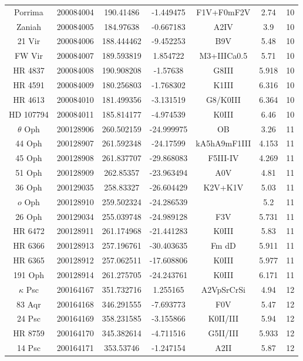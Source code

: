 \begin{table*}
\begin{tabular}{ccccccc}
Porrima & 200084004 & 190.41486 & -1.449475 & F1V+F0mF2V & 2.74 & 10 \\
Zaniah & 200084005 & 184.97638 & -0.667183 & A2IV & 3.9 & 10 \\
21 Vir & 200084006 & 188.444462 & -9.452253 & B9V & 5.48 & 10 \\
FW Vir & 200084007 & 189.593819 & 1.854722 & M3+IIICa0.5 & 5.71 & 10 \\
HR 4837 & 200084008 & 190.908208 & -1.57638 & G8III & 5.918 & 10 \\
HR 4591 & 200084009 & 180.256803 & -1.768302 & K1III & 6.316 & 10 \\
HR 4613 & 200084010 & 181.499356 & -3.131519 & G8/K0III & 6.364 & 10 \\
HD 107794 & 200084011 & 185.814177 & -4.974539 & K0III & 6.46 & 10 \\
$\theta$ Oph & 200128906 & 260.502159 & -24.999975 & OB & 3.26 & 11 \\
44 Oph & 200128907 & 261.592348 & -24.17599 & kA5hA9mF1III & 4.153 & 11 \\
45 Oph & 200128908 & 261.837707 & -29.868083 & F5III-IV & 4.269 & 11 \\
51 Oph & 200128909 & 262.85357 & -23.963494 & A0V & 4.81 & 11 \\
36 Oph & 200129035 & 258.83327 & -26.604429 & K2V+K1V & 5.03 & 11 \\
$o$ Oph & 200128910 & 259.502324 & -24.286539 &  & 5.2 & 11 \\
26 Oph & 200129034 & 255.039748 & -24.989128 & F3V & 5.731 & 11 \\
HR 6472 & 200128911 & 261.174968 & -21.441283 & K0III & 5.83 & 11 \\
HR 6366 & 200128913 & 257.196761 & -30.403635 & Fm dD & 5.911 & 11 \\
HR 6365 & 200128912 & 257.062511 & -17.608806 & K0III & 5.977 & 11 \\
191 Oph & 200128914 & 261.275705 & -24.243761 & K0III & 6.171 & 11 \\
$\kappa$ Psc & 200164167 & 351.732716 & 1.255165 & A2VpSrCrSi & 4.94 & 12 \\
83 Aqr & 200164168 & 346.291555 & -7.693773 & F0V & 5.47 & 12 \\
24 Psc & 200164169 & 358.231585 & -3.155866 & K0II/III & 5.94 & 12 \\
HR 8759 & 200164170 & 345.382614 & -4.711516 & G5II/III & 5.933 & 12 \\
14 Psc & 200164171 & 353.53746 & -1.247154 & A2II & 5.87 & 12 \\

\end{tabular}
\end{table*}
